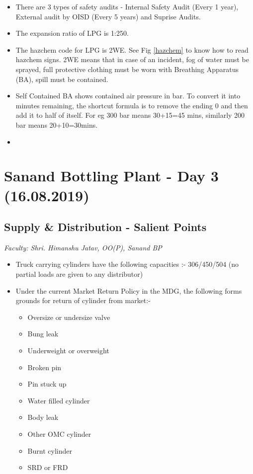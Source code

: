 \documentclass{report}
\begin{document}
\begin{itemize}
		\item There are 3 types of safety audits - Internal Safety Audit (Every 1 year), External audit by OISD (Every 5 years) and Suprise Audits.
		\item The expansion ratio of LPG is 1:250.
		\item The hazchem code for LPG is 2WE. See Fig \ref{hazchem} to know how to read hazchem signs. 2WE means that in case of an incident, fog of water must be sprayed, full protective clothing must be worn with Breathing Apparatus (BA), spill must be contained.
		\item Self Contained BA shows contained air pressure in bar. To convert it into minutes remaining, the shortcut formula is to remove the ending 0 and then add it to half of itself. For eg 300 bar means 30+15=45 mins, similarly 200 bar means 20+10=30mins.
		\item 
	\end{itemize}
	
	\section{Sanand Bottling Plant - Day 3 (16.08.2019)}
	
	\subsection{Supply \& Distribution - Salient Points}
	\textit{Faculty: Shri. Himanshu Jatav, OO(P), Sanand BP}\\
	\begin{itemize}
		\item Truck carrying cylinders have the following capacities :- 306/450/504 (no partial loads are given to any distributor)
		\item Under the current Market Return Policy in the MDG, the following forms grounds for return of cylinder from market:-
		\begin{itemize}
			\item Oversize or undersize valve
			\item Bung leak
			\item Underweight or overweight
			\item Broken pin
			\item Pin stuck up
			\item Water filled cylinder
			\item Body leak
			\item Other OMC cylinder 
			\item Burnt cylinder
			\item SRD or FRD
		\end{itemize}
	\end{itemize}
	
\end{document}

